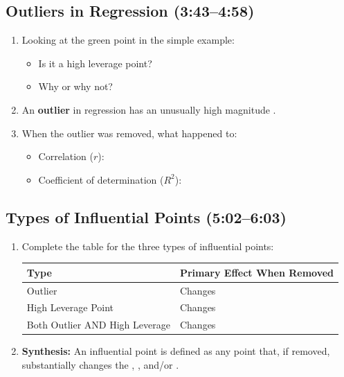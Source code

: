 \documentclass[11pt]{article}
\begin{document}
\subsection*{Outliers in Regression (3:43--4:58)}
\begin{enumerate}[resume, label=\arabic*.]
\item Looking at the green point in the simple example:
\begin{itemize}
\item Is it a high leverage point? \underline{\hspace{0.5in}} 
\item Why or why not? \underline{\hspace{3in}}
\end{itemize}

\item An \textbf{outlier} in regression has an unusually high magnitude \underline{\hspace{1.5in}}.

\item When the outlier was removed, what happened to:
\begin{itemize}
\item Correlation ($r$): \underline{\hspace{1.5in}}
\item Coefficient of determination ($R^2$): \underline{\hspace{1.5in}}
\end{itemize}
\end{enumerate}

\subsection*{Types of Influential Points (5:02--6:03)}
\begin{enumerate}[resume, label=\arabic*.]
\item Complete the table for the three types of influential points:

\begin{center}
\begin{tabular}{|p{2in}|p{3.5in}|}
\hline
\textbf{Type} & \textbf{Primary Effect When Removed} \\
\hline
Outlier & Changes \underline{\hspace{2.5in}} \\
\hline
High Leverage Point & Changes \underline{\hspace{2.5in}} \\
\hline
Both Outlier AND High Leverage & Changes \underline{\hspace{2.5in}} \\
\hline
\end{tabular}
\end{center}

\item \textbf{Synthesis:} An influential point is defined as any point that, if removed, substantially changes the \underline{\hspace{0.8in}}, \underline{\hspace{0.8in}}, and/or \underline{\hspace{0.8in}}.
\end{enumerate}
\end{document}
